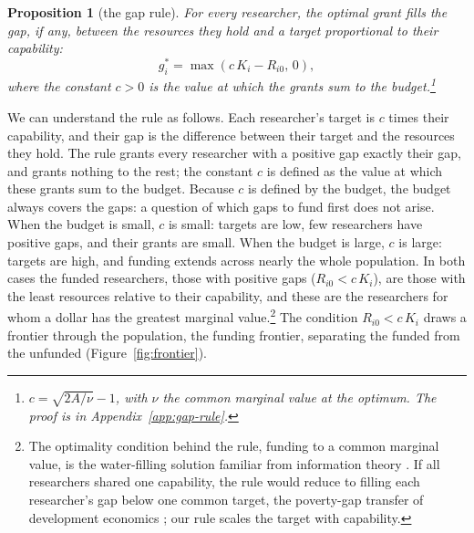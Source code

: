 \documentclass[article, 11pt, reqno]{amsart}
\newtheorem{prop}{Proposition}
\theoremstyle{named}
\begin{document}
\begin{prop}[the gap rule]\label{prop:gap-rule}
For every researcher, the optimal grant fills the gap, if any, between the resources they hold and a target proportional to their capability:
\[
g_i^* = \max(c\,K_i - R_{i0},\, 0),
\]
where the constant $c > 0$ is the value at which the grants sum to the budget.\footnote{$c = \sqrt{2A/\nu} - 1$, with $\nu$ the common marginal value at the optimum. The proof is in Appendix~\ref{app:gap-rule}.}
\end{prop}

We can understand the rule as follows. Each researcher's target is $c$ times their capability, and their gap is the difference between their target and the resources they hold. The rule grants every researcher with a positive gap exactly their gap, and grants nothing to the rest; the constant $c$ is defined as the value at which these grants sum to the budget. Because $c$ is defined by the budget, the budget always covers the gaps: a question of which gaps to fund first does not arise. When the budget is small, $c$ is small: targets are low, few researchers have positive gaps, and their grants are small. When the budget is large, $c$ is large: targets are high, and funding extends across nearly the whole population. In both cases the funded researchers, those with positive gaps ($R_{i0} < c\,K_i$), are those with the least resources relative to their capability, and these are the researchers for whom a dollar has the greatest marginal value.\footnote{The optimality condition behind the rule, funding to a common marginal value, is the water-filling solution familiar from information theory \citep{CoverThomas2006}. If all researchers shared one capability, the rule would reduce to filling each researcher's gap below one common target, the poverty-gap transfer of development economics \citep{FGT1984}; our rule scales the target with capability.} The condition $R_{i0} < c\,K_i$ draws a frontier through the population, the funding frontier, separating the funded from the unfunded (Figure~\ref{fig:frontier}).


\end{document}
